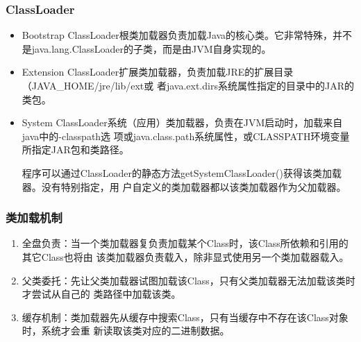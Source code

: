 \begin{frame}[fragile] %
\frametitle{ClassLoader}
\begin{itemize}
\item Bootstrap ClassLoader根类加载器负责加载Java的核心类。它非常特殊，并不
  是java.lang.ClassLoader的子类，而是由JVM自身实现的。
\item Extension ClassLoader扩展类加载器，负责加载JRE的扩展目录（JAVA\_HOME/jre/lib/ext或
  者java.ext.dirs系统属性指定的目录中的JAR的类包。
\item System ClassLoader系统（应用）类加载器，负责在JVM启动时，加载来自java中的-classpath选
  项或java.class.path系统属性，或CLASSPATH环境变量所指定JAR包和类路径。

  程序可以通过ClassLoader的静态方法getSystemClassLoader()获得该类加载器。没有特别指定，用
  户自定义的类加载器都以该类加载器作为父加载器。
\end{itemize}
\end{frame}

\begin{frame}[fragile] %
\frametitle{类加载机制}


\begin{enumerate}
\item 全盘负责：当一个类加载器复负责加载某个Class时，该Class所依赖和引用的其它Class也将由
  该类加载器负责载入，除非显式使用另一个类加载器载入。
\item 父类委托：先让父类加载器试图加载该Class，只有父类加载器无法加载该类时才尝试从自己的
  类路径中加载该类。
\item 缓存机制：类加载器先从缓存中搜索Class，只有当缓存中不存在该Class对象时，系统才会重
  新读取该类对应的二进制数据。
\end{enumerate}
\end{frame}

